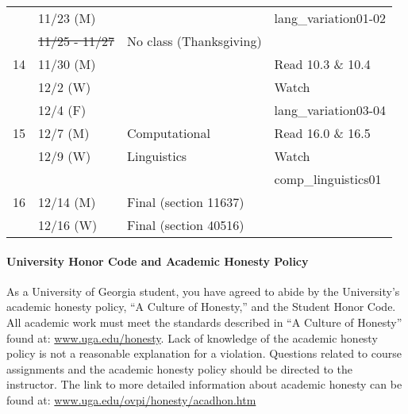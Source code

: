 \documentclass{article}
\begin{document}
\begin{longtable}{c l l | l}
            & 11/23 (M)   &                                 & lang\_variation01-02\\
            & \sout{11/25 - 11/27} & No class (Thanksgiving)       & \\
      \hline
      14    & 11/30 (M)   &                                 & Read 10.3 \& 10.4\\
            & 12/2 (W)    &                                 & Watch\\
            & 12/4 (F)    &                                 & lang\_variation03-04\\
      \hline
      15    & 12/7 (M)    & Computational                   & Read 16.0 \& 16.5\\
            & 12/9 (W)    & Linguistics                     & Watch\\
            &             &                                 & comp\_linguistics01\\
      \hline
      16    & 12/14 (M)   & Final (section 11637)           & \\
            & 12/16 (W)   & Final (section 40516)           &
    \end{longtable}

  \paragraph{University Honor Code and Academic Honesty Policy}
    As a University of Georgia student, you have agreed to abide by the University’s academic honesty policy, ``A Culture of Honesty,'' and the Student Honor Code. All academic work must meet the standards described in ``A Culture of Honesty'' found at: \url{www.uga.edu/honesty}. Lack of knowledge of the academic honesty policy is not a reasonable explanation for a violation. Questions related to course assignments and the academic honesty policy should be directed to the instructor. The link to more detailed information about academic honesty can be found at: \url{www.uga.edu/ovpi/honesty/acadhon.htm}
\end{document}
